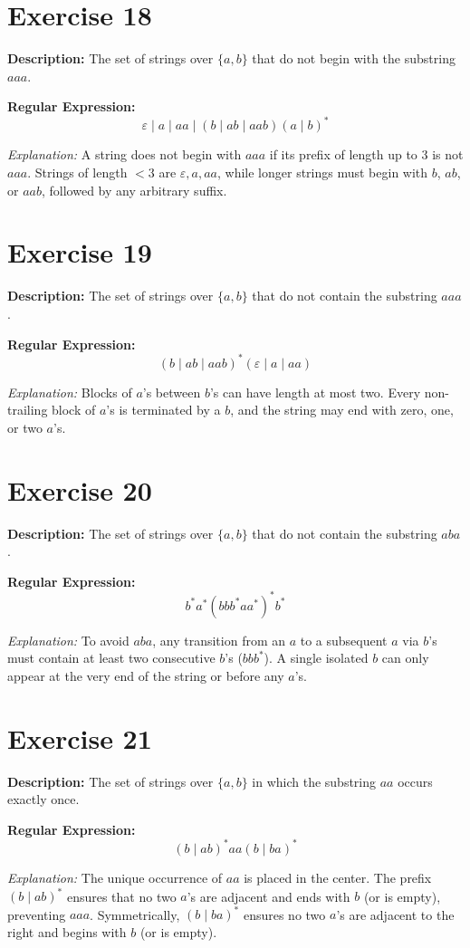 \documentclass[12pt]{article}
\newcommand{\exercisedescription}[1]{%
    \Needspace{4\baselineskip}%
    \noindent\textbf{Description:} #1\par
    \vspace{0.25cm}
}
\newcommand{\reexpression}[1]{%
    \noindent\textbf{Regular Expression:}
    \vspace{-0.25cm}
    \begin{equation*}
        #1
    \end{equation*}
    \vspace{-0.15cm}
}
\newcommand{\reexplanation}[1]{%
    \noindent\textit{Explanation:} #1\par
    \vspace{0.55cm}
}
\begin{document}

\section*{Exercise 18}
\exercisedescription{%
    The set of strings over $\{a,b\}$ that do not begin with the substring $aaa$.
}
\reexpression{%
    \varepsilon \mid a \mid aa \mid (b \mid ab \mid aab)(a \mid b)^*
}
\reexplanation{%
    A string does not begin with $aaa$ if its prefix of length up to 3 is not $aaa$. Strings of length $< 3$ are $\varepsilon, a, aa$, while longer strings must begin with $b$, $ab$, or $aab$, followed by any arbitrary suffix.
}


\section*{Exercise 19}
\exercisedescription{%
    The set of strings over $\{a,b\}$ that do not contain the substring $aaa$.
}
\reexpression{%
    (b \mid ab \mid aab)^* (\varepsilon \mid a \mid aa)
}
\reexplanation{%
    Blocks of $a$'s between $b$'s can have length at most two. Every non-trailing block of $a$'s is terminated by a $b$, and the string may end with zero, one, or two $a$'s.
}
\newpage


\section*{Exercise 20}
\exercisedescription{%
    The set of strings over $\{a,b\}$ that do not contain the substring $aba$.
}
\reexpression{%
    b^* a^* (b b b^* a a^*)^* b^*
}
\reexplanation{%
    To avoid $aba$, any transition from an $a$ to a subsequent $a$ via $b$'s must contain at least two consecutive $b$'s ($b b b^*$). A single isolated $b$ can only appear at the very end of the string or before any $a$'s.
}


\section*{Exercise 21}
\exercisedescription{%
    The set of strings over $\{a,b\}$ in which the substring $aa$ occurs exactly once.
}
\reexpression{%
    (b \mid ab)^* aa (b \mid ba)^*
}
\reexplanation{%
    The unique occurrence of $aa$ is placed in the center. The prefix $(b \mid ab)^*$ ensures that no two $a$'s are adjacent and ends with $b$ (or is empty), preventing $aaa$. Symmetrically, $(b \mid ba)^*$ ensures no two $a$'s are adjacent to the right and begins with $b$ (or is empty).
}
\end{document}
